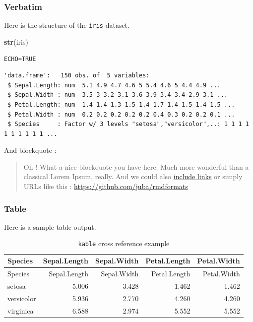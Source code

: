 \documentclass[
]{article}
\newenvironment{Shaded}{\begin{snugshade}}{\end{snugshade}}
\newcommand{\KeywordTok}[1]{\textcolor[rgb]{0.12,0.11,0.11}{\textbf{#1}}}
\newcommand{\NormalTok}[1]{\textcolor[rgb]{0.12,0.11,0.11}{#1}}
\begin{document}
\hypertarget{verbatim}{%
\subsubsection{Verbatim}\label{verbatim}}

Here is the structure of the \texttt{iris} dataset.

\begin{Shaded}
\begin{Highlighting}[]
\KeywordTok{str}\NormalTok{(iris)}
\end{Highlighting}
\end{Shaded}

\begin{codelisting}

\caption{\texttt{ECHO=TRUE}}

\hypertarget{lst:echo}{%
\label{lst:echo}}%
\begin{verbatim}
'data.frame':   150 obs. of  5 variables:
 $ Sepal.Length: num  5.1 4.9 4.7 4.6 5 5.4 4.6 5 4.4 4.9 ...
 $ Sepal.Width : num  3.5 3 3.2 3.1 3.6 3.9 3.4 3.4 2.9 3.1 ...
 $ Petal.Length: num  1.4 1.4 1.3 1.5 1.4 1.7 1.4 1.5 1.4 1.5 ...
 $ Petal.Width : num  0.2 0.2 0.2 0.2 0.2 0.4 0.3 0.2 0.2 0.1 ...
 $ Species     : Factor w/ 3 levels "setosa","versicolor",..: 1 1 1 1 1 1 1 1 1 1 ...
\end{verbatim}

\end{codelisting}

And blockquote :

\begin{quote}
Oh ! What a nice blockquote you have here. Much more wonderful than a
classical Lorem Ipsum, really. And we could also
\href{https://github.com/juba/rmdformats}{include links} or simply URLs
like this : \url{https://github.com/juba/rmdformats}
\end{quote}

\hypertarget{table}{%
\subsubsection{Table}\label{table}}

Here is a sample table output.

\hypertarget{tbl:kable}{}
\begin{longtable}[]{@{}lrrrr@{}}
\caption{\label{tbl:kable}\texttt{kable} cross reference
example}\tabularnewline
\toprule
Species & Sepal.Length & Sepal.Width & Petal.Length &
Petal.Width\tabularnewline
\midrule
\endfirsthead
\toprule
Species & Sepal.Length & Sepal.Width & Petal.Length &
Petal.Width\tabularnewline
\midrule
\endhead
setosa & 5.006 & 3.428 & 1.462 & 1.462\tabularnewline
versicolor & 5.936 & 2.770 & 4.260 & 4.260\tabularnewline
virginica & 6.588 & 2.974 & 5.552 & 5.552\tabularnewline
\bottomrule
\end{longtable}
\end{document}
